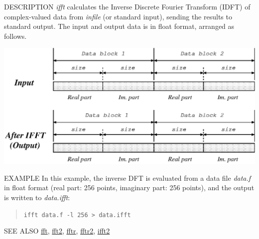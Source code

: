 \begin{synopsis}
\item[ifft] [ --l $L$ ]  [ --\{ R $|$ I \} ] [ {\em infile} ] 
\end{synopsis}

\begin{qsection}{DESCRIPTION}
{\em ifft} calculates the Inverse Discrete Fourier Transform (IDFT) 
of complex-valued data from {\em infile} (or standard input), 
sending the results to standard output.
The input and output data is in float format, arranged as follows.
\begin{center}
 \leavevmode
 \includegraphics{fig/ifft.eps} 
\end{center}
\end{qsection}

\begin{options}
\end{options}

\begin{qsection}{EXAMPLE}
In this example, the inverse DFT is evaluated from a data file
{\em data.f} in float format
(real part: 256 points, imaginary part: 256 points),
and the output is written to {\em data.ifft}:
\begin{quote}
  \verb!ifft data.f -l 256 > data.ifft!
\end{quote}
\end{qsection}

\begin{qsection}{SEE ALSO}
\hyperlink{fft}{fft},
\hyperlink{fft2}{fft2},
\hyperlink{fftr}{fftr},
\hyperlink{fftr2}{fftr2},
\hyperlink{ifft2}{ifft2}
\end{qsection}
